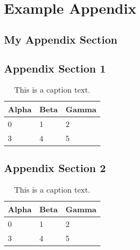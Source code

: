 %
\chapter{Example Appendix}
\label{ch:appendix}

\Blindtext[1][1]





\section{My Appendix Section}
\label{sec:appendix:allfindings}

\section{Appendix Section 1}
\label{sec:appendix:sec1}

\Blindtext[1][1]

\begin{table}[h]
	\begin{tabularx}{\textwidth}{X | X | X}
		Alpha		& Beta			& Gamma			\\ \hline
		0			& 1				& 2				\\ \hline
		3			& 4				& 5				\\ %
	\end{tabularx}
	\label{tab:table1}
	\caption{This is a caption text.}
\end{table}

\section{Appendix Section 2}
\label{sec:appendix:sec2}

\Blindtext[1][1]

\begin{table}[h]
	\begin{tabularx}{\textwidth}{X | X | X}
		Alpha		& Beta			& Gamma			\\ \hline
		0			& 1				& 2				\\ \hline
		3			& 4				& 5				\\ %
	\end{tabularx}
	\label{tab:table2}
	\caption{This is a caption text.}
\end{table}

\Blindtext[1][2]
